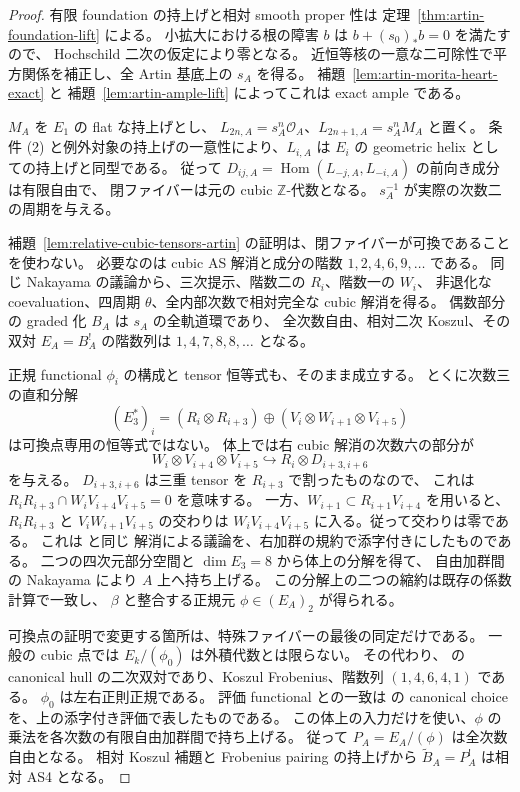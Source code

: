\begin{proof}
有限 foundation の持上げと相対 smooth proper 性は
定理~\ref{thm:artin-foundation-lift} による。
小拡大における根の障害 $b$ は $b+(s_0)_*b=0$ を満たすので、
Hochschild 二次の仮定により零となる。
近恒等核の一意な二可除性で平方関係を補正し、全 Artin 基底上の $s_A$ を得る。
補題~\ref{lem:artin-morita-heart-exact} と
補題~\ref{lem:artin-ample-lift} によってこれは exact ample である。

$M_A$ を $E_1$ の flat な持上げとし、
$L_{2n,A}=s_A^n\mathcal O_A$、$L_{2n+1,A}=s_A^nM_A$ と置く。
条件 (2) と例外対象の持上げの一意性により、$L_{i,A}$ は
$E_i$ の geometric helix としての持上げと同型である。
従って $D_{ij,A}=\operatorname{Hom}(L_{-j,A},L_{-i,A})$ の前向き成分は有限自由で、
閉ファイバーは元の cubic $\mathbb Z$-代数となる。
$s_A^{-1}$ が実際の次数二の周期を与える。

補題~\ref{lem:relative-cubic-tensors-artin} の証明は、閉ファイバーが可換であることを使わない。
必要なのは cubic AS 解消と成分の階数 $1,2,4,6,9,\ldots$ である。
同じ Nakayama の議論から、三次提示、階数二の $R_i$、階数一の $W_i$、
非退化な coevaluation、四周期 $\theta$、全内部次数で相対完全な cubic 解消を得る。
偶数部分の graded 化 $B_A$ は $s_A$ の全軌道環であり、
全次数自由、相対二次 Koszul、その双対 $E_A=B_A^!$ の階数列は
$1,4,7,8,8,\ldots$ となる。

正規 functional $\phi_i$ の構成と tensor 恒等式も、そのまま成立する。
とくに次数三の直和分解
\[
 (E_3^*)_i=(R_i\otimes R_{i+3})
       \oplus(V_i\otimes W_{i+1}\otimes V_{i+5})
\]
は可換点専用の恒等式ではない。
体上では右 cubic 解消の次数六の部分が
\[
 W_i\otimes V_{i+4}\otimes V_{i+5}
 \hookrightarrow R_i\otimes D_{i+3,i+6}
\]
を与える。
$D_{i+3,i+6}$ は三重 tensor を $R_{i+3}$ で割ったものなので、
これは $R_iR_{i+3}\cap W_iV_{i+4}V_{i+5}=0$ を意味する。
一方、$W_{i+1}\subset R_{i+1}V_{i+4}$ を用いると、
$R_iR_{i+3}$ と $V_iW_{i+1}V_{i+5}$ の交わりは
$W_iV_{i+4}V_{i+5}$ に入る。従って交わりは零である。
これは \cite[Lemmas 2.3--2.4]{BauwensVanDenBergh1998} と同じ
解消による議論を、右加群の規約で添字付きにしたものである。
二つの四次元部分空間と $\dim E_3=8$ から体上の分解を得て、
自由加群間の Nakayama により $A$ 上へ持ち上げる。
この分解上の二つの縮約は既存の係数計算で一致し、
$\beta$ と整合する正規元 $\phi\in(E_A)_2$ が得られる。

可換点の証明で変更する箇所は、特殊ファイバーの最後の同定だけである。
一般の cubic 点では $E_k/(\phi_0)$ は外積代数とは限らない。
その代わり、\cite[Theorem 6.1, Lemmas 6.4--6.5]{VdB2011} の
canonical hull の二次双対であり、Koszul Frobenius、階数列 $(1,4,6,4,1)$ である。
$\phi_0$ は左右正則正規である。
評価 functional との一致は
\cite[(2.11), Proposition 3.2, Remark 3.3]{BauwensVanDenBergh1998} の
canonical choice を、上の添字付き評価で表したものである。
この体上の入力だけを使い、$\phi$ の乗法を各次数の有限自由加群間で持ち上げる。
従って $P_A=E_A/(\phi)$ は全次数自由となる。
相対 Koszul 補題と Frobenius pairing の持上げから
$\widetilde B_A=P_A^!$ は相対 AS4 となる。


\end{proof}
